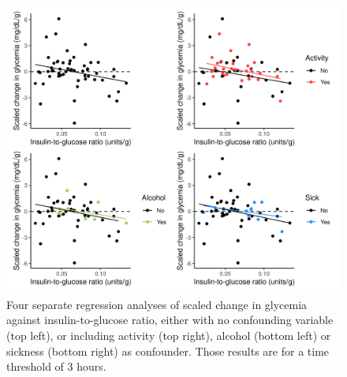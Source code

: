 \begin{figure}[H]
	\centering
	\includegraphics[width=\textwidth]{figures/separate_regressions_3_0.png}
	\caption{Four separate regression analyses of scaled change in glycemia against insulin-to-glucose ratio, either with no confounding variable (top left), or including activity (top right), alcohol (bottom left) or sickness (bottom right) as confounder. Those results are for a time threshold of 3 hours.}
	\label{fig:regressions}
\end{figure}